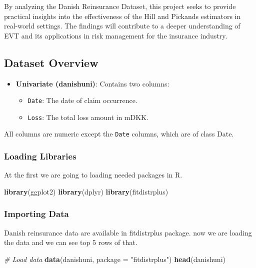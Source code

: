 \documentclass[
  12pt,
]{article}
\newenvironment{Shaded}{\begin{snugshade}}{\end{snugshade}}
\newcommand{\AttributeTok}[1]{\textcolor[rgb]{0.13,0.29,0.53}{#1}}
\newcommand{\CommentTok}[1]{\textcolor[rgb]{0.56,0.35,0.01}{\textit{#1}}}
\newcommand{\FunctionTok}[1]{\textcolor[rgb]{0.13,0.29,0.53}{\textbf{#1}}}
\newcommand{\NormalTok}[1]{#1}
\newcommand{\StringTok}[1]{\textcolor[rgb]{0.31,0.60,0.02}{#1}}
\providecommand{\tightlist}{%
  \setlength{\itemsep}{0pt}\setlength{\parskip}{0pt}}
\begin{document}
By analyzing the Danish Reinsurance Dataset, this project seeks to
provide practical insights into the effectiveness of the Hill and
Pickands estimators in real-world settings. The findings will contribute
to a deeper understanding of EVT and its applications in risk management
for the insurance industry.

\subsection{Dataset Overview}\label{dataset-overview}

\begin{itemize}
\tightlist
\item
  \textbf{Univariate (danishuni)}: Contains two columns:

  \begin{itemize}
  \tightlist
  \item
    \texttt{Date}: The date of claim occurrence.
  \item
    \texttt{Loss}: The total loss amount in mDKK.
  \end{itemize}
\end{itemize}

All columns are numeric except the \texttt{Date} columns, which are of
class Date.

\subsubsection{Loading Libraries}\label{loading-libraries}

At the first we are going to loading needed packages in R.

\begin{Shaded}
\begin{Highlighting}[]
\FunctionTok{library}\NormalTok{(ggplot2)}
\FunctionTok{library}\NormalTok{(dplyr)}
\FunctionTok{library}\NormalTok{(fitdistrplus)}
\end{Highlighting}
\end{Shaded}

\subsubsection{Importing Data}\label{importing-data}

Danish reinsurance data are available in fitdistrplus package. now we
are loading the data and we can see top 5 rows of that.

\begin{Shaded}
\begin{Highlighting}[]
\CommentTok{\# Load data}
\FunctionTok{data}\NormalTok{(danishuni, }\AttributeTok{package =} \StringTok{"fitdistrplus"}\NormalTok{)}
\FunctionTok{head}\NormalTok{(danishuni)}
\end{Highlighting}
\end{Shaded}
\end{document}
